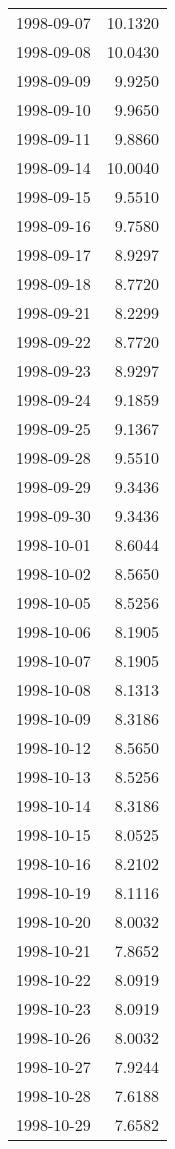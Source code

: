 \begin{tabular}{lr}
1998-09-07 &     10.1320 \\
1998-09-08 &     10.0430 \\
1998-09-09 &      9.9250 \\
1998-09-10 &      9.9650 \\
1998-09-11 &      9.8860 \\
1998-09-14 &     10.0040 \\
1998-09-15 &      9.5510 \\
1998-09-16 &      9.7580 \\
1998-09-17 &      8.9297 \\
1998-09-18 &      8.7720 \\
1998-09-21 &      8.2299 \\
1998-09-22 &      8.7720 \\
1998-09-23 &      8.9297 \\
1998-09-24 &      9.1859 \\
1998-09-25 &      9.1367 \\
1998-09-28 &      9.5510 \\
1998-09-29 &      9.3436 \\
1998-09-30 &      9.3436 \\
1998-10-01 &      8.6044 \\
1998-10-02 &      8.5650 \\
1998-10-05 &      8.5256 \\
1998-10-06 &      8.1905 \\
1998-10-07 &      8.1905 \\
1998-10-08 &      8.1313 \\
1998-10-09 &      8.3186 \\
1998-10-12 &      8.5650 \\
1998-10-13 &      8.5256 \\
1998-10-14 &      8.3186 \\
1998-10-15 &      8.0525 \\
1998-10-16 &      8.2102 \\
1998-10-19 &      8.1116 \\
1998-10-20 &      8.0032 \\
1998-10-21 &      7.8652 \\
1998-10-22 &      8.0919 \\
1998-10-23 &      8.0919 \\
1998-10-26 &      8.0032 \\
1998-10-27 &      7.9244 \\
1998-10-28 &      7.6188 \\
1998-10-29 &      7.6582 \\

\end{tabular}

